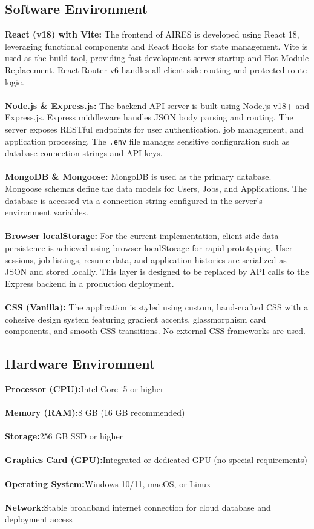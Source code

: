  \subsection{Software Environment}
 \textbf{React (v18) with Vite:}
 The frontend of AIRES is developed using React 18, leveraging functional components and React Hooks for state management. Vite is used as the build tool, providing fast development server startup and Hot Module Replacement. React Router v6 handles all client-side routing and protected route logic.\\\\
 \textbf{Node.js \& Express.js:}
 The backend API server is built using Node.js v18+ and Express.js. Express middleware handles JSON body parsing and routing. The server exposes RESTful endpoints for user authentication, job management, and application processing. The \texttt{.env} file manages sensitive configuration such as database connection strings and API keys.\\\\
 \textbf{MongoDB \& Mongoose:}
 MongoDB is used as the primary database. Mongoose schemas define the data models for Users, Jobs, and Applications. The database is accessed via a connection string configured in the server's environment variables.\\\\
 \textbf{Browser localStorage:}
 For the current implementation, client-side data persistence is achieved using browser localStorage for rapid prototyping. User sessions, job listings, resume data, and application histories are serialized as JSON and stored locally. This layer is designed to be replaced by API calls to the Express backend in a production deployment.\\\\
 \textbf{CSS (Vanilla):}
 The application is styled using custom, hand-crafted CSS with a cohesive design system featuring gradient accents, glassmorphism card components, and smooth CSS transitions. No external CSS frameworks are used.

  
  \subsection{Hardware Environment}
  \textbf{Processor (CPU):}Intel Core i5 or higher\\\\
  \textbf{Memory (RAM):}8 GB (16 GB recommended)\\\\
  \textbf{Storage:}256 GB SSD or higher\\\\
  \textbf{Graphics Card (GPU):}Integrated or dedicated GPU (no special requirements)\\\\
  \textbf{Operating System:}Windows 10/11, macOS, or Linux\\\\
  \textbf{Network:}Stable broadband internet connection for cloud database and deployment access
  \newpage
  
